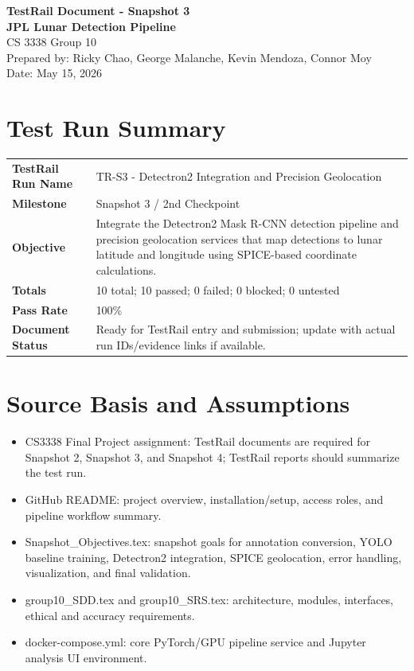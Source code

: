 \documentclass[11pt,landscape]{article}
\begin{document}
\begin{center}
{\LARGE\textbf{TestRail Document - Snapshot 3}}\\[0.3cm]
{\large\textbf{JPL Lunar Detection Pipeline}}\\
CS 3338 Group 10\\
Prepared by: Ricky Chao, George Malanche, Kevin Mendoza, Connor Moy\\
Date: May 15, 2026
\end{center}
\section*{Test Run Summary}
\begin{tabular}{p{2.2in}p{7.6in}}\toprule
\textbf{TestRail Run Name} & TR-S3 - Detectron2 Integration and Precision Geolocation \\
\textbf{Milestone} & Snapshot 3 / 2nd Checkpoint \\
\textbf{Objective} & Integrate the Detectron2 Mask R-CNN detection pipeline and precision geolocation services that map detections to lunar latitude and longitude using SPICE-based coordinate calculations. \\
\textbf{Totals} & 10 total; 10 passed; 0 failed; 0 blocked; 0 untested \\
\textbf{Pass Rate} & 100\% \\
\textbf{Document Status} & Ready for TestRail entry and submission; update with actual run IDs/evidence links if available. \\
\bottomrule\end{tabular}
\section*{Source Basis and Assumptions}
\begin{itemize}[leftmargin=*]
\item CS3338 Final Project assignment: TestRail documents are required for Snapshot 2, Snapshot 3, and Snapshot 4; TestRail reports should summarize the test run.
\item GitHub README: project overview, installation/setup, access roles, and pipeline workflow summary.
\item Snapshot\_Objectives.tex: snapshot goals for annotation conversion, YOLO baseline training, Detectron2 integration, SPICE geolocation, error handling, visualization, and final validation.
\item group10\_SDD.tex and group10\_SRS.tex: architecture, modules, interfaces, ethical and accuracy requirements.
\item docker-compose.yml: core PyTorch/GPU pipeline service and Jupyter analysis UI environment.
\end{itemize}
\end{document}
